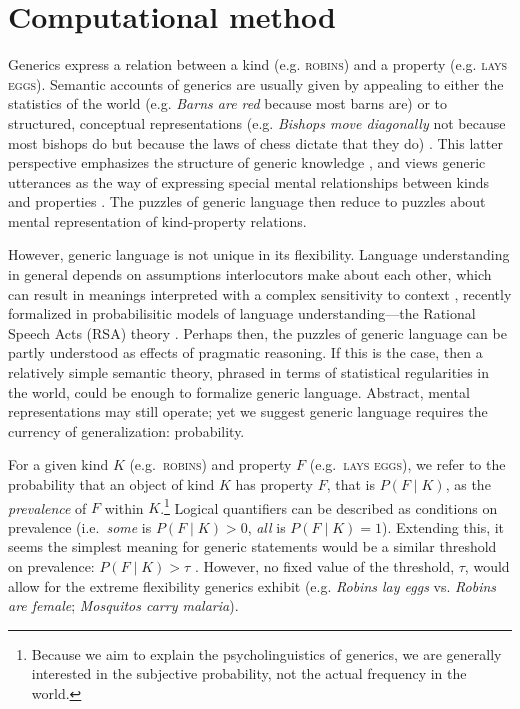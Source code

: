 \documentclass[10pt,letterpaper]{article}
\begin{document}
\section*{Computational method}


Generics express a relation between a kind (e.g. \textsc{robins}) and a property (e.g. \textsc{lays eggs}). 
Semantic accounts of generics are usually given by appealing to either the statistics of the world (e.g. \emph{Barns are red} because most barns are) or to structured, conceptual representations (e.g. \emph{Bishops move diagonally} not because most bishops do but because the laws of chess dictate that they do) \cite{Carlson1995essay}. 
This latter perspective emphasizes the structure of generic knowledge \cite{Prasada2000}, and views generic utterances as the way of expressing special mental relationships between kinds and properties \cite{Leslie2008, Prasada2012}. The puzzles of generic language then reduce to puzzles about mental representation of kind-property relations.

However, generic language is not unique in its flexibility.
Language understanding in general depends on assumptions interlocutors make about each other, which can result in meanings interpreted with a complex sensitivity to context \cite{Clark1996,Grice1975,Levinson2000}, recently formalized in probabilisitic models of language understanding---the Rational Speech Acts (RSA) theory \cite{Frank2012,Goodman2013}. 
Perhaps then, the puzzles of generic language can be partly understood as effects of pragmatic reasoning.
If this is the case, then a relatively simple semantic theory, phrased in terms of statistical regularities in the world, could be enough to formalize generic language.
Abstract, mental representations may still operate; yet we suggest generic language requires the currency of generalization: probability. 

For a given kind $K$ (e.g.~\textsc{robins}) and property $F$ (e.g.~\textsc{lays eggs}), we refer to the probability that an object of kind $K$ has property $F$, that is $P(F\mid K)$, as the \emph{prevalence} of $F$ within $K$.\footnote{Because we aim to explain the psycholinguistics of generics, we are generally interested in the subjective probability, not the actual frequency in the world.}
Logical quantifiers can be described as conditions on prevalence (i.e.~\emph{some} is $P(F\mid K)>0$, \emph{all} is $P(F\mid K)=1$). 
Extending this, it seems the simplest meaning for generic statements would be a similar threshold on prevalence: $P(F\mid K)>\tau$ \cite{Cohen1999}. 
However, no fixed value of the threshold, $\tau$, would allow for the extreme flexibility generics exhibit (e.g. \emph{Robins lay eggs} vs. \emph{Robins are female}; \emph{Mosquitos carry malaria}).%
\end{document}

